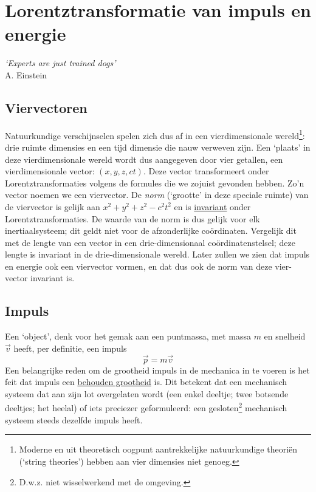 \chapter{Lorentztransformatie van impuls en energie}
\vspace{-1cm}\begin{flushright}
{\it `Experts are just trained dogs'}\\ A. Einstein
\end{flushright}

\section{Viervectoren}
Natuurkundige verschijnselen spelen zich dus af in een
vierdimensionale wereld\footnote{Moderne en uit theoretisch oogpunt
aantrekkelijke natuurkundige theori\"{e}n (`string theories') hebben
aan vier dimensies niet genoeg.}: drie ruimte dimensies en een tijd
dimensie die nauw verweven zijn.  Een `plaats' in deze
vierdimensionale wereld wordt dus aangegeven door vier getallen, een
vierdimensionale vector: $(x, y, z, ct)$.  Deze vector transformeert
onder Lorentztransformaties volgens de formules die we zojuist
gevonden hebben.  Zo'n vector noemen we een viervector.  De {\it norm}
(`grootte' in deze speciale ruimte) van de viervector is gelijk aan
$x^{2} + y^{2} + z^{2} - c^{2}t^{2}$ en is \underline{invariant} onder
Lorentztransformaties. De waarde van de norm is dus gelijk voor elk
inertiaalsysteem; dit geldt niet voor de afzonderlijke
co\"ordinaten. Vergelijk dit met de lengte van een vector in een
drie-dimensionaal co\"ordinatenstelsel; deze lengte is invariant in de
drie-dimensionale wereld.  Later zullen we zien dat impuls en energie
ook een viervector vormen, en dat dus ook de norm van deze vier-vector
invariant is.


\section{Impuls}
Een `object', denk voor het gemak aan een puntmassa, met massa $m$ en snelheid
$\vec{v}$ heeft, per definitie, een impuls
\begin{displaymath}
\vec{p} = m\vec{v}
\end{displaymath}
Een belangrijke reden om de grootheid impuls in de mechanica in te voeren
is het feit dat impuls een \underline{behouden grootheid} is.
Dit betekent dat een mechanisch systeem dat aan zijn lot overgelaten wordt
(een enkel deeltje; twee botsende deeltjes; het heelal) of iets
preciezer geformuleerd: een gesloten\footnote{D.w.z. niet wisselwerkend met de omgeving.}
mechanisch systeem steeds dezelfde impuls heeft.

